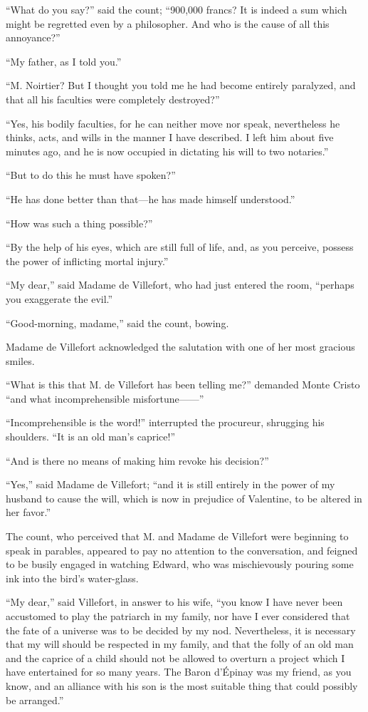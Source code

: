 “What do you say?” said the count; “900,000 francs? It is indeed a sum
which might be regretted even by a philosopher. And who is the cause of
all this annoyance?”

“My father, as I told you.”

“M. Noirtier? But I thought you told me he had become entirely
paralyzed, and that all his faculties were completely destroyed?”

“Yes, his bodily faculties, for he can neither move nor speak,
nevertheless he thinks, acts, and wills in the manner I have described.
I left him about five minutes ago, and he is now occupied in dictating
his will to two notaries.”

“But to do this he must have spoken?”

“He has done better than that—he has made himself understood.”

“How was such a thing possible?”

“By the help of his eyes, which are still full of life, and, as you
perceive, possess the power of inflicting mortal injury.”

“My dear,” said Madame de Villefort, who had just entered the room,
“perhaps you exaggerate the evil.”

“Good-morning, madame,” said the count, bowing.

Madame de Villefort acknowledged the salutation with one of her most
gracious smiles.

“What is this that M. de Villefort has been telling me?” demanded Monte
Cristo “and what incomprehensible misfortune——”

“Incomprehensible is the word!” interrupted the procureur, shrugging
his shoulders. “It is an old man’s caprice!”

“And is there no means of making him revoke his decision?”

“Yes,” said Madame de Villefort; “and it is still entirely in the power
of my husband to cause the will, which is now in prejudice of
Valentine, to be altered in her favor.”

The count, who perceived that M. and Madame de Villefort were beginning
to speak in parables, appeared to pay no attention to the conversation,
and feigned to be busily engaged in watching Edward, who was
mischievously pouring some ink into the bird’s water-glass.

“My dear,” said Villefort, in answer to his wife, “you know I have
never been accustomed to play the patriarch in my family, nor have I
ever considered that the fate of a universe was to be decided by my
nod. Nevertheless, it is necessary that my will should be respected in
my family, and that the folly of an old man and the caprice of a child
should not be allowed to overturn a project which I have entertained
for so many years. The Baron d’Épinay was my friend, as you know, and
an alliance with his son is the most suitable thing that could possibly
be arranged.”

